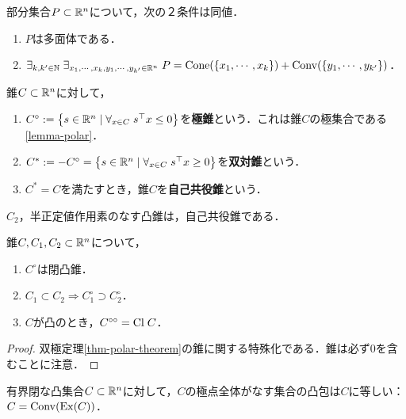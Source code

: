 \documentclass[uplatex,dvipdfmx]{jsreport}
\begin{document}
\begin{lemma}[多面体の特徴付け]
    部分集合$P\subset\mathbb{R}^n$について，次の２条件は同値．
    \begin{enumerate}
        \item $P$は多面体である．
        \item $\exists_{k,k'\in\mathbb{N}}\;\exists_{x_1,\cdots,x_k,y_1,\cdots,y_{k'}\in\mathbb{R}^n}\;P=\mathrm{Cone}(\{x_1,\cdots,x_k\})+\mathrm{Conv}(\{y_1,\cdots,y_{k'}\})$．
    \end{enumerate}
\end{lemma}

\begin{definition}
    錐$C\subset\mathbb{R}^n$に対して，
    \begin{enumerate}
        \item $C^\circ:=\left\{s\in\mathbb{R}^n\mid\forall_{x\in C}\;s^\top x\le0\right\}$を\textbf{極錐}という．これは錐$C$の極集合である\ref{lemma-polar}．
        \item $C^*:=-C^\circ=\left\{s\in\mathbb{R}^n\mid\forall_{x\in C}\; s^\top x\ge0\right\}$を\textbf{双対錐}という．
        \item $C^*=C$を満たすとき，錐$C$を\textbf{自己共役錐}という．
    \end{enumerate}
\end{definition}

\begin{example}[自己共役錐]
    $C_2$，半正定値作用素のなす凸錐は，自己共役錐である．
\end{example}

\begin{corollary}[双極定理]
    錐$C,C_1,C_2\subset\mathbb{R}^n$について，
    \begin{enumerate}
        \item $C^\circ$は閉凸錐．
        \item $C_1\subset C_2\Rightarrow C_1^\circ\supset C_2^\circ$．
        \item $C$が凸のとき，$C^{\circ\circ}=\mathrm{Cl}\;C$．
    \end{enumerate}
\end{corollary}
\begin{proof}
    双極定理\ref{thm-polar-theorem}の錐に関する特殊化である．錐は必ず$0$を含むことに注意．
\end{proof}

\begin{corollary}
    有界閉な凸集合$C\subset\mathbb{R}^n$に対して，$C$の極点全体がなす集合の凸包は$C$に等しい：$C=\mathrm{Conv}(\mathrm{Ex}(C))$．
\end{corollary}
\end{document}
